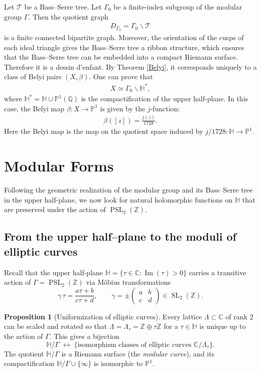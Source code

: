 \documentclass[10pt, a4paper]{article}
\renewcommand{\P}{\mathbb{P}}
\newcommand{\C}{\mathbb{C}}
\newcommand{\Z}{\mathbb{Z}}
\newcommand{\Q}{\mathbb{Q}}
\newcommand{\HH}{\mathbb{H}} %
\newcommand{\SL}{\operatorname{SL}_2(\Z)}
\newcommand{\PSL}{\operatorname{PSL}_2(\Z)}
\renewcommand{\Im}{\operatorname{Im}}
\theoremstyle{definition}
\newtheorem{proposition}[theorem]{Proposition}
\theoremstyle{remark}
\begin{document}
Let \(\mathcal{T}\) be a Bass--Serre tree. Let \(\Gamma_0\) be a finite-index subgroup of the modular group \(\Gamma\). Then the quotient graph
\begin{align*}
    D_{\Gamma_0} = \Gamma_0 \backslash \mathcal{T}
\end{align*}
is a finite connected bipartite graph. Moreover, the orientation of the cusps of each ideal triangle gives the Bass--Serre tree a ribbon structure, which ensures that the Bass--Serre tree can be embedded into a compact Riemann surface.
Therefore it is a dessin d'enfant.
By Theorem \ref{Belyi}, it corresponds uniquely to a class of Belyi pairs \((X,\beta)\). One can prove that
\begin{align*}
    X \simeq \Gamma_0 \backslash \HH^*, 
\end{align*}
where \(\HH^*= \HH\cup \P^1(\Q)\) is the compactification of the upper half-plane. In this case, the Belyi map \(\beta:X\to \P^1\) is given by the \(j\)-function:
\begin{align*}
    \beta([z]) = \frac{j(z)}{1728}.
\end{align*}
Here the Belyi map is the map on the quotient space induced by \(j/1728:\HH \to \P^1\).


\section{Modular Forms}

Following the geometric realization of the modular group and its Bass–Serre tree in the upper half-plane, we now look for natural holomorphic functions on $\HH$ that are preserved under the action of $\PSL$.

\subsection{From the upper half–plane to the moduli of elliptic curves}
\label{sec:elliptic_moduli}

Recall that the upper half‑plane $\HH = \{\tau\in\C : \Im(\tau)>0\}$ carries a transitive action of $\Gamma = \PSL$ via Möbius transformations
\[
\gamma\,\tau = \frac{a\tau+b}{c\tau+d}, \qquad \gamma = \pm\begin{pmatrix}a&b\\c&d\end{pmatrix}\in\SL.
\]

\begin{proposition}[Uniformization of elliptic curves]
Every lattice $\Lambda\subset\C$ of rank $2$ can be scaled and rotated so that $\Lambda = \Lambda_\tau = \Z\oplus\tau\Z$ for a $\tau\in\HH$ is unique up to the action of $\Gamma$. This gives a bijection
\[
\HH / \Gamma \;\longleftrightarrow\; \{\text{isomorphism classes of elliptic curves } \C/\Lambda_\tau\}.
\]
The quotient $\HH/\Gamma$ is a Riemann surface (the \emph{modular curve}), and its compactification $\HH/\Gamma\cup\{\infty\}$ is isomorphic to $\mathbb P^1$.\cite{DiamondShurman2005}
\end{proposition}
\end{document}
